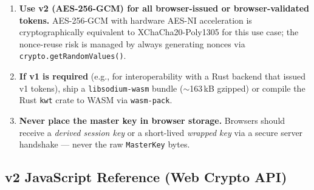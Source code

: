 \documentclass[11pt, letterpaper]{article}
\begin{document}
\begin{enumerate}
  \item \textbf{Use v2 (AES-256-GCM) for all browser-issued or browser-validated
        tokens.} AES-256-GCM with hardware AES-NI acceleration is cryptographically
        equivalent to XChaCha20-Poly1305 for this use case; the nonce-reuse risk
        is managed by always generating nonces via \texttt{crypto.getRandomValues()}.

  \item \textbf{If v1 is required} (e.g., for interoperability with a Rust
        backend that issued v1 tokens), ship a \texttt{libsodium-wasm} bundle
        ($\sim$163\,kB gzipped) or compile the Rust \texttt{kwt} crate
        to WASM via \texttt{wasm-pack}.

  \item \textbf{Never place the master key in browser storage.}
        Browsers should receive a \emph{derived session key} or a short-lived
        \emph{wrapped key} via a secure server handshake — never the raw
        \texttt{MasterKey} bytes.
\end{enumerate}

\subsection{v2 JavaScript Reference (Web Crypto API)}
\end{document}
